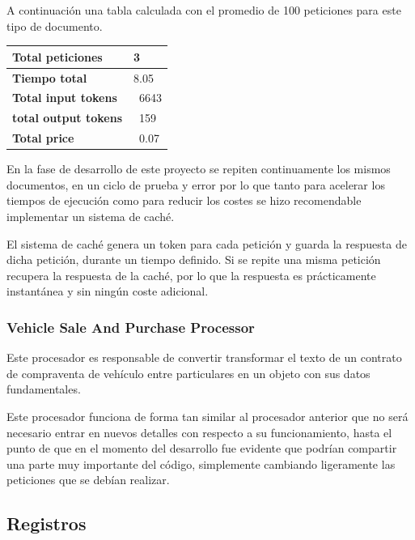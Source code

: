 A continuación una tabla calculada con el promedio de 100 peticiones para este tipo de documento.

\begin{table}[h]
    \renewcommand{\arraystretch}{1.5}
    \begin{tabular}{p{} p{}}
        \hline\textbf{Total peticiones}    & 3     \\
        \hline\textbf{Tiempo total}        & 8.05  \\
        \hline\textbf{Total input tokens}  & ~6643 \\
        \hline\textbf{total output tokens} & ~159  \\
        \hline\textbf{Total price}         & ~0.07 \\
        \hline
    \end{tabular}
    \label{tab:residential_lease_processor}
\end{table}

En la fase de desarrollo de este proyecto se repiten continuamente los mismos documentos, en un ciclo de prueba y error
por lo que tanto para acelerar los tiempos de ejecución como para reducir los costes se hizo recomendable implementar
un sistema de caché.

El sistema de caché genera un token para cada petición y guarda la respuesta de dicha petición, durante un tiempo
definido.
Si se repite una misma petición recupera la respuesta de la caché, por lo que la respuesta es prácticamente
instantánea y sin ningún coste adicional.

\subsubsection*{Vehicle Sale And Purchase Processor}

Este procesador es responsable de convertir transformar el texto de un contrato de compraventa de vehículo entre
particulares en un objeto con sus datos fundamentales.

Este procesador funciona de forma tan similar al procesador anterior que no será necesario entrar en nuevos detalles
con respecto a su funcionamiento, hasta el punto de que en el momento del desarrollo fue evidente que podrían
compartir una parte muy importante del código, simplemente cambiando ligeramente las peticiones que se debían realizar.

\subsection*{Registros}

